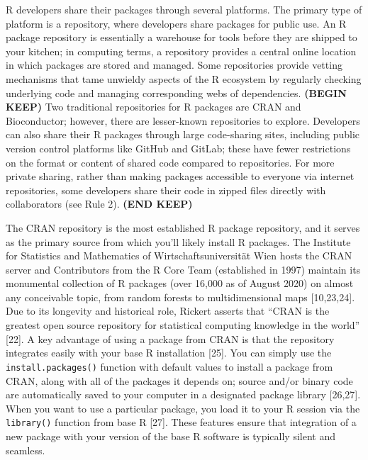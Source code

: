 \documentclass[10pt,letterpaper]{article}
\begin{document}
R developers share their packages through several platforms. The primary
type of platform is a repository, where developers share packages for
public use. An R package repository is essentially a warehouse for tools
before they are shipped to your kitchen; in computing terms, a
repository provides a central online location in which packages are
stored and managed. Some repositories provide vetting mechanisms that
tame unwieldy aspects of the R ecosystem by regularly checking
underlying code and managing corresponding webs of dependencies.
\textbf{(BEGIN KEEP)} Two traditional repositories for R packages are
CRAN and Bioconductor; however, there are lesser-known repositories to
explore. Developers can also share their R packages through large
code-sharing sites, including public version control platforms like
GitHub and GitLab; these have fewer restrictions on the format or
content of shared code compared to repositories. For more private
sharing, rather than making packages accessible to everyone via internet
repositories, some developers share their code in zipped files directly
with collaborators (see Rule 2). \textbf{(END KEEP)}

The CRAN repository is the most established R package repository, and it
serves as the primary source from which you'll likely install R
packages. The Institute for Statistics and Mathematics of
Wirtschaftsuniversität Wien hosts the CRAN server and Contributors from
the R Core Team (established in 1997) maintain its monumental collection
of R packages (over 16,000 as of August 2020) on almost any conceivable
topic, from random forests to multidimensional maps {[}10,23,24{]}. Due
to its longevity and historical role, Rickert asserts that ``CRAN is the
greatest open source repository for statistical computing knowledge in
the world'' {[}22{]}. A key advantage of using a package from CRAN is
that the repository integrates easily with your base R installation
{[}25{]}. You can simply use the \texttt{install.packages()} function
with default values to install a package from CRAN, along with all of
the packages it depends on; source and/or binary code are automatically
saved to your computer in a designated package library {[}26,27{]}. When
you want to use a particular package, you load it to your R session via
the \texttt{library()} function from base R {[}27{]}. These features
ensure that integration of a new package with your version of the base R
software is typically silent and seamless.
\end{document}
